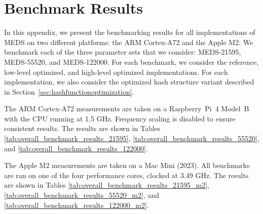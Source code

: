 \chapter{Benchmark Results}
\label{app:benchmark_results}
In this appendix, we present the benchmarking results for all implementations of MEDS on two different platforms: the ARM Cortex-A72 and the Apple M2. We benchmark each of the three parameter sets that we consider: MEDS-21595, MEDS-55520, and MEDS-122000. For each benchmark, we consider the reference, low-level optimized, and high-level optimized implementations. For each implementation, we also consider the optimized hash structure variant described in Section~\ref{sec:hashfunctionoptimization}.

The ARM Cortex-A72 measurements are taken on a Raspberry~Pi~4 Model~B with the CPU running at 1.5 GHz. Frequency scaling is disabled to ensure consistent results. The results are shown in Tables \ref{tab:overall_benchmark_results_21595}, \ref{tab:overall_benchmark_results_55520}, and \ref{tab:overall_benchmark_results_122000}.

The Apple M2 measurements are taken on a Mac Mini (2023). All benchmarks are ran on one of the four performance cores, clocked at 3.49 GHz. The results are shown in Tables \ref{tab:overall_benchmark_results_21595_m2}, \ref{tab:overall_benchmark_results_55520_m2}, and \ref{tab:overall_benchmark_results_122000_m2}.

\pagebreak

